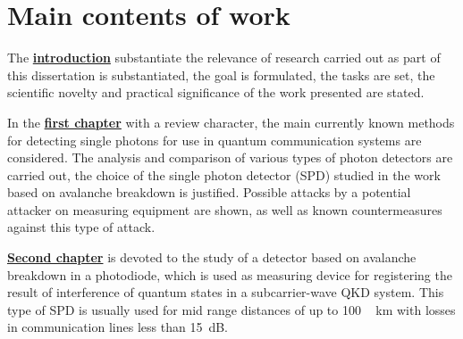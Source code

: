 

 \section*{Main contents of work}
 The \underline{\textbf{introduction}} substantiate the relevance of research carried out as part of this dissertation is substantiated, the goal is formulated, the tasks are set, the scientific novelty and practical significance of the work presented are stated.

 In the \underline{\textbf{first chapter}} with a review character, the main currently known methods for detecting single photons for use in quantum communication systems are considered. The analysis and comparison of various types of photon detectors are carried out, the choice of the single photon detector (SPD) studied in the work based on avalanche breakdown is justified. Possible attacks by a potential attacker on measuring equipment are shown, as well as known countermeasures against this type of attack.



 \underline{\textbf{Second chapter}} is devoted to the study of a detector based on avalanche breakdown in a photodiode, which is used as measuring device for registering the result of interference of quantum states in a subcarrier-wave QKD system. This type of SPD is usually used for mid range distances of up to 100 ~ km with losses in communication lines less than 15~dB.

